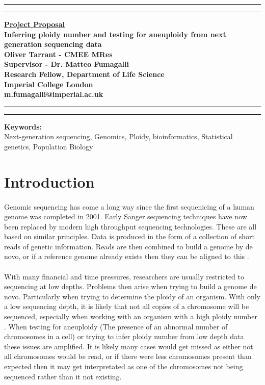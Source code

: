 \documentclass[11pt]{article}
\newcommand{\soptitle}{Inferring ploidy number and testing for aneuploidy from next generation sequencing data}
\begin{document}
\begin{titlepage}


\begin{center}
\hrule
\vspace{2pt}
\hrule
\vspace{2cm}
\LARGE {\bf \underline{Project Proposal}}\\
\vspace{2cm}
\huge{\bf \soptitle}\\
\vspace{4cm}
\LARGE {\bf Oliver Tarrant - CMEE MRes}\\
\vfill
\huge {\bf Supervisor - Dr. Matteo Fumagalli}\\
\LARGE {\bf Research Fellow, Department of Life Science}\\
\LARGE {\bf Imperial College London}\\
\large {\bf m.fumagalli@imperial.ac.uk}
\end{center}
\hrule
\vspace{2pt}
\hrule
\end{titlepage}
\linenumbers
{\bf Keywords: }\\ Next-generation sequencing, Genomics, Ploidy, bioinformatics,  Statistical genetics, Population Biology
\section{Introduction}
\paragraph{} Genomic sequencing has come a long way since the first sequenicing of a human genome was completed in 2001. Early Sanger sequencing techniques have now been replaced by modern high throughput sequencing technologies. These are all based on similar principles. Data is produced in the form of a collection of short reads of genetic information. Reads are then combined to build a genome by de novo, or if a reference genome already exists then they can be aligned to this \autocite{Jason2015}.
\paragraph{} With many financial and time pressures, researchers are usually restricted to sequencing at low depths. Problems then arise when trying to build a genome de novo. Particularly when trying to determine the ploidy of an organism. With only a low sequencing depth, it is likely that not all copies of a chromosome will be sequenced, especially when working with an organism with a high ploidy number \autocite{Nielsen2011}. When testing for aneuploidy (The presence of an abnormal number of chromosomes in a cell) or trying to infer ploidy number from low depth data these issues are amplified. It is likely many cases would get missed as either not all chromosomes would be read, or if there were less chromosomes present than expected then it may get interpretated as one of the chromosomes not being sequenced rather than it not existing.
\end{document}
